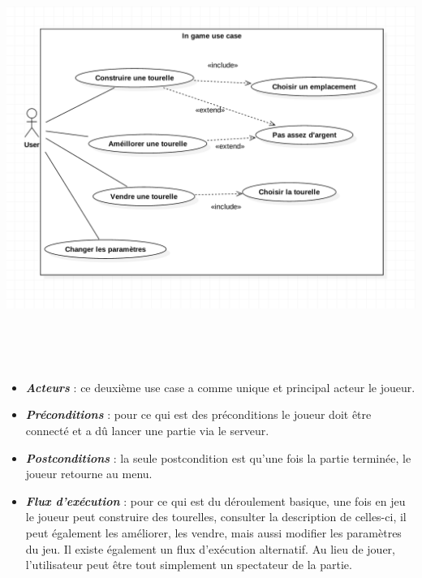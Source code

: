 \documentclass[10pt,a4paper]{article}
\begin{document}
\begin{center}
    \includegraphics[height=13.5cm,width=17cm]{ingame_use_case.png}
\end{center}

\begin{itemize}
\item \textit{\textbf{Acteurs}} : ce deuxième use case a comme unique et principal acteur le \gls{joueur}.\\

\item \textit{\textbf{Préconditions}} : pour ce qui est des préconditions le \gls{joueur} doit être connecté et a dû lancer une partie via le \gls{serveur}.\\

\item \textit{\textbf{Postconditions}} : la seule postcondition est qu'une fois la partie terminée, le \gls{joueur} retourne au menu.\\

\item \textit{\textbf{Flux d'exécution}} : pour ce qui est du déroulement basique, une fois en jeu le \gls{joueur} peut construire des tourelles, consulter la description de celles-ci, il peut également les améliorer, les vendre, mais aussi modifier les paramètres du jeu. Il existe également un flux d'exécution alternatif. Au lieu de jouer, l'\gls{utilisateur} peut être tout simplement un spectateur de la partie.

\end{itemize}
\end{document}
